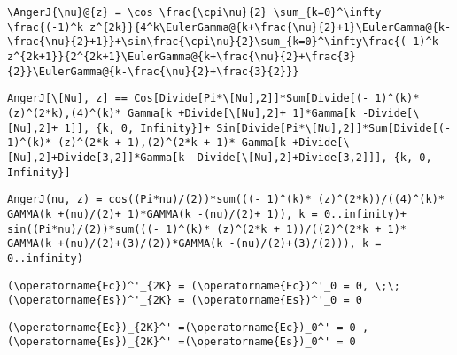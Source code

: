 \newsavebox\CEST
\begin{lrbox}{\CEST}
 \begin{minipage}[t]{0.82\textwidth}
  \lstinline[language={[latex]TeX},mathescape,breaklines=true]"\AngerJ{\nu}@{z} = \cos \frac{\cpi\nu}{2} \sum_{k=0}^\infty \frac{(-1)^k z^{2k}}{4^k\EulerGamma@{k+\frac{\nu}{2}+1}\EulerGamma@{k-\frac{\nu}{2}+1}}+\sin\frac{\cpi\nu}{2}\sum_{k=0}^\infty\frac{(-1)^k z^{2k+1}}{2^{2k+1}\EulerGamma@{k+\frac{\nu}{2}+\frac{3}{2}}\EulerGamma@{k-\frac{\nu}{2}+\frac{3}{2}}}"
 \end{minipage}
\end{lrbox}
\newsavebox\CEMM
\begin{lrbox}{\CEMM}
 \begin{minipage}[t]{0.82\textwidth}
  \lstinline[language={[latex]TeX},mathescape,breaklines=true]"AngerJ[\[Nu], z] == Cos[Divide[Pi*\[Nu],2]]*Sum[Divide[(- 1)^(k)* (z)^(2*k),(4)^(k)* Gamma[k +Divide[\[Nu],2]+ 1]*Gamma[k -Divide[\[Nu],2]+ 1]], {k, 0, Infinity}]+ Sin[Divide[Pi*\[Nu],2]]*Sum[Divide[(- 1)^(k)* (z)^(2*k + 1),(2)^(2*k + 1)* Gamma[k +Divide[\[Nu],2]+Divide[3,2]]*Gamma[k -Divide[\[Nu],2]+Divide[3,2]]], {k, 0, Infinity}]"
 \end{minipage}
\end{lrbox}
\newsavebox\CEMA
\begin{lrbox}{\CEMA}
 \begin{minipage}[t]{0.82\textwidth}
  \lstinline[language={[latex]TeX},mathescape,breaklines=true]"AngerJ(nu, z) = cos((Pi*nu)/(2))*sum(((- 1)^(k)* (z)^(2*k))/((4)^(k)* GAMMA(k +(nu)/(2)+ 1)*GAMMA(k -(nu)/(2)+ 1)), k = 0..infinity)+ sin((Pi*nu)/(2))*sum(((- 1)^(k)* (z)^(2*k + 1))/((2)^(2*k + 1)* GAMMA(k +(nu)/(2)+(3)/(2))*GAMMA(k -(nu)/(2)+(3)/(2))), k = 0..infinity)"
 \end{minipage}
\end{lrbox}
\newsavebox\CFT
\begin{lrbox}{\CFT}
 \begin{minipage}[t]{0.82\textwidth}
  \lstinline[language={[latex]TeX},mathescape,breaklines=true]"(\operatorname{Ec})^'_{2K} = (\operatorname{Ec})^'_0 = 0, \;\; (\operatorname{Es})^'_{2K} = (\operatorname{Es})^'_0 = 0"
 \end{minipage}
\end{lrbox}
\newsavebox\CFST
\begin{lrbox}{\CFST}
 \begin{minipage}[t]{0.82\textwidth}
  \lstinline[language={[latex]TeX},mathescape,breaklines=true]"(\operatorname{Ec})_{2K}^' =(\operatorname{Ec})_0^' = 0 ,(\operatorname{Es})_{2K}^' =(\operatorname{Es})_0^' = 0"
 \end{minipage}
\end{lrbox}
